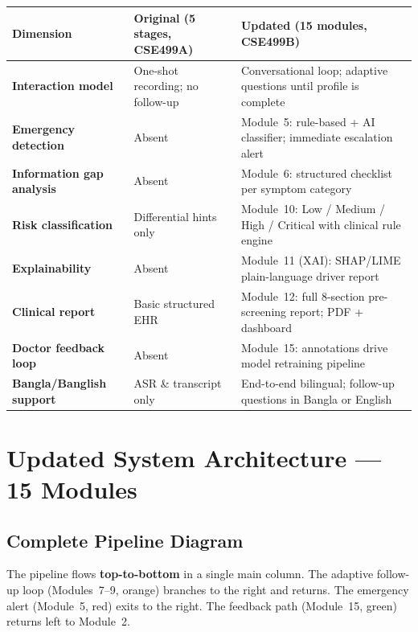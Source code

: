 \documentclass[11pt,a4paper]{article}
\begin{document}
\footnotesize\setlength{\tabcolsep}{4pt}\renewcommand{\arraystretch}{1.3}
\begin{tabularx}{\linewidth}{>{\bfseries}p{2.9cm} X X}
\toprule
Dimension & \textbf{Original (5 stages, CSE499A)} & \textbf{Updated (15 modules, CSE499B)} \\
\midrule
Interaction model
  & One-shot recording; no follow-up
  & Conversational loop; adaptive questions until profile is complete \\
Emergency detection
  & Absent
  & Module~5: rule-based + AI classifier; immediate escalation alert \\
Information gap analysis
  & Absent
  & Module~6: structured checklist per symptom category \\
Risk classification
  & Differential hints only
  & Module~10: Low / Medium / High / Critical with clinical rule engine \\
Explainability
  & Absent
  & Module~11 (XAI): SHAP/LIME plain-language driver report \\
Clinical report
  & Basic structured EHR
  & Module~12: full 8-section pre-screening report; PDF + dashboard \\
Doctor feedback loop
  & Absent
  & Module~15: annotations drive model retraining pipeline \\
Bangla/Banglish support
  & ASR \& transcript only
  & End-to-end bilingual; follow-up questions in Bangla or English \\
\bottomrule
\end{tabularx}
\normalsize

\section{Updated System Architecture --- 15 Modules}

\subsection{Complete Pipeline Diagram}

The pipeline flows \textbf{top-to-bottom} in a single main column.
The adaptive follow-up loop (Modules~7--9, orange) branches to the right
and returns. The emergency alert (Module~5, red) exits to the right.
The feedback path (Module~15, green) returns left to Module~2.
\end{document}
